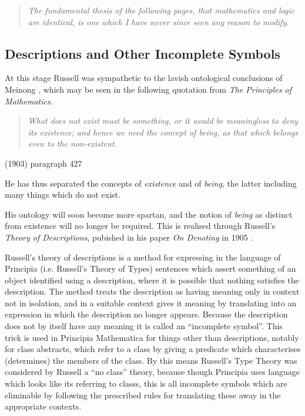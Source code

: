 \documentclass[10pt,titlepage]{book}
\begin{document}
\begin{quote}
  {\it The fundamental thesis of the following pages, that mathematics and logic are identical, is one which I have never since seen any reason to modify.
  }
\end{quote}

\subsection{Descriptions and Other Incomplete Symbols}

At this stage Russell was sympathetic to the lavish ontological conclusions of Meinong \cite{meinong-gegenstandstheorie-a,meinong-gegenstandstheorie-b}, which may be seen in the following quotation from {\it The Principles of Mathematics}.

\begin{quote}
  {\it What does not exist must be something, or it would be meaningless to deny its existence; and hence we need the concept of being, as that which belongs even to the non-existent.}
\end{quote}
(1903) paragraph 427\cite{russell03}

He has thus separated the concepts of {\it existence} and of {\it being}, the latter including many things which do not exist.

His ontology will soon become more spartan, and the notion of {\it being} as distinct from existence will no longer be required.
This is realised through Russell's {\it Theory of Descriptions}, pubished in his paper {\it On Denoting} in 1905 \cite{russellOD}.

Russell's theory of descriptions is a method for expressing in the language of Principia (i.e. Russell's Theory of Types) sentences which assert something of an object identified using a description, where it is possible that nothing satisfies the description.
The method treats the description as having meaning only in context not in isolation, and in a suitable context gives it meaning by translating into an expression in which the description no longer appears.
Because the description does not by itself have any meaning it is called an ``incomplete symbol''.
This trick is used in Principia Mathematica for things other than descriptions, notably for class abstracts, which refer to a class by giving a predicate which characterises (determines) the members of the class.
By this means Russell's Type Theory was considered by Russell a ``no class'' theory, because though Principia uses language which looks like its referring to classs, this is all incomplete symbols which are eliminable by following the prescribed rules for translating these away in the appropriate contexts.
\end{document}
